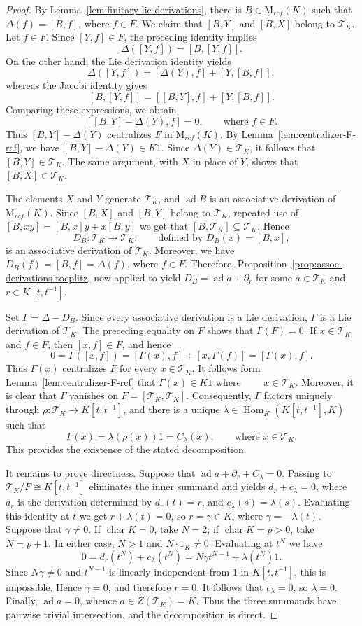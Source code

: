 \documentclass[11pt]{article}
\numberwithin{equation}{section}
\theoremstyle{plain}
\theoremstyle{definition}
\numberwithin{equation}{section}
\newcommand{\T}{\mathscr T_K}
\begin{document}
\begin{proof}
By Lemma~\ref{lem:finitary-lie-derivations}, there is $B\in\mathrm M_{rcf}(K)$ such that $\Delta(f)=[B,f]$, where $f\in F$. We claim that $[B,Y]$ and $[B,X]$ belong to $\T$. Let $f\in F$. Since $[Y,f]\in F$, the preceding identity implies
$$
\Delta([Y,f])=[B,[Y,f]].
$$
On the other hand, the Lie derivation identity yields
$$
\Delta([Y,f])=[\Delta(Y),f]+[Y,[B,f]],
$$
whereas the Jacobi identity gives
$$
[B,[Y,f]]=[[B,Y],f]+[Y,[B,f]].
$$
Comparing these expressions, we obtain
$$
[[B,Y]-\Delta(Y),f]=0,
\qquad\text{where } f\in F.
$$
Thus $[B,Y]-\Delta(Y)$ centralizes $F$ in $\mathrm M_{rcf}(K)$. By Lemma~\ref{lem:centralizer-F-rcf}, we have $[B,Y]-\Delta(Y)\in K1$. Since $\Delta(Y)\in\T$, it follows that $[B,Y]\in\T$. The same argument, with $X$ in place of $Y$, shows that $[B,X]\in\T$.

The elements $X$ and $Y$ generate $\T$, and $\operatorname{ad}B$ is an associative derivation of $\mathrm M_{rcf}(K)$. Since $[B,X]$ and $[B,Y]$ belong to $\T$, repeated use of $[B,xy]=[B,x]y+x[B,y]$ we get  that $[B,\T]\subseteq\T$. Hence
$$
D_B:\T\longrightarrow\T,
\qquad\text{defined by }
D_B(x)=[B,x],
$$
is an associative derivation of $\T$. Moreover, we have $D_B(f)=[B,f]=\Delta(f)$, where $f\in F$. Therefore, Proposition~\ref{prop:assoc-derivations-toeplitz} now applied to yield $D_B=\operatorname{ad}a+\partial_r$ for some $a\in\T$ and $r\in K[t,t^{-1}]$.

Set $\Gamma=\Delta-D_B$. Since every associative derivation is a Lie derivation, $\Gamma$ is a Lie derivation of $\T^-$. The preceding equality on $F$ shows that $\Gamma(F)=0$. If $x\in\T$ and $f\in F$, then $[x,f]\in F$, and hence
$$
0=\Gamma([x,f])
=[\Gamma(x),f]+[x,\Gamma(f)]
=[\Gamma(x),f].
$$
Thus $\Gamma(x)$ centralizes $F$ for every $x\in\T$. It follows form Lemma~\ref{lem:centralizer-F-rcf} that $\Gamma(x)\in K1$ where $\qquad x\in\T$. Moreover, it is clear that $\Gamma$ vanishes on $F=[\T,\T]$. Consequently, $\Gamma$ factors uniquely through $\rho:\T\to K[t,t^{-1}]$, and there is a unique $\lambda\in\operatorname{Hom}_K(K[t,t^{-1}],K)$ such that
$$
\Gamma(x)=\lambda(\rho(x))1=C_\lambda(x),
\qquad \text{where }x\in\T.
$$
This provides the existence of the stated decomposition.

It remains to prove directness. Suppose that $\operatorname{ad}a+\partial_r+C_\lambda=0$. Passing to $\T/F\cong K[t,t^{-1}]$ eliminates the inner summand and yields $d_r+c_\lambda=0$, where $d_r$ is the derivation determined by $d_r(t)=r$, and $c_\lambda(s)=\lambda(s)$. Evaluating this identity at $t$ we get $r+\lambda(t)=0$, so $r=\gamma\in K$, where $\gamma=-\lambda(t)$. Suppose that $\gamma\neq0$. If $\operatorname{char}K=0$, take $N=2$; if $\operatorname{char}K=p>0$, take $N=p+1$. In either case, $N>1$ and $N\cdot1_K\neq0$. Evaluating at $t^N$ we have
$$
0=d_r(t^N)+c_\lambda(t^N)
=N\gamma t^{N-1}+\lambda(t^N)1.
$$
Since $N\gamma\neq0$ and $t^{N-1}$ is linearly independent from $1$ in $K[t,t^{-1}]$, this is impossible. Hence $\gamma=0$, and therefore $r=0$. It follows that $c_\lambda=0$, so $\lambda=0$. Finally, $\operatorname{ad}a=0$, whence $a\in Z(\T)=K$. Thus the three summands have pairwise trivial intersection, and the decomposition is direct.
\end{proof}
\end{document}
